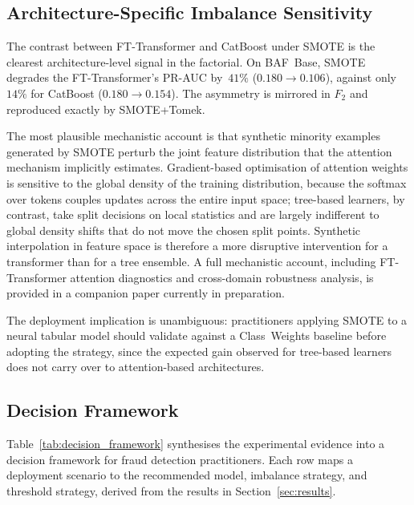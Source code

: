 \documentclass[a4paper,fleqn]{cas-sc}
\begin{document}
\subsection{Architecture-Specific Imbalance Sensitivity}
\label{subsec:disc_architecture}

The contrast between FT-Transformer and CatBoost under SMOTE is the clearest
architecture-level signal in the factorial. On BAF~Base, SMOTE degrades the
FT-Transformer's PR-AUC by~$41\%$ ($0.180\!\to\!0.106$), against only~$14\%$ for
CatBoost ($0.180\!\to\!0.154$). The asymmetry is mirrored in $F_2$ and reproduced
exactly by SMOTE+Tomek.

The most plausible mechanistic account is that synthetic minority examples generated by
SMOTE perturb the joint feature distribution that the attention mechanism implicitly
estimates. Gradient-based optimisation of attention weights is sensitive to the global
density of the training distribution, because the softmax over tokens couples updates
across the entire input space; tree-based learners, by contrast, take split decisions on
local statistics and are largely indifferent to global density shifts that do not move
the chosen split points. Synthetic interpolation in feature space is therefore a more
disruptive intervention for a transformer than for a tree ensemble. A full mechanistic
account, including FT-Transformer attention diagnostics and cross-domain robustness
analysis, is provided in a companion paper currently in preparation.

The deployment implication is unambiguous: practitioners applying SMOTE to a neural
tabular model should validate against a Class~Weights baseline before adopting the
strategy, since the expected gain observed for tree-based learners does not carry over
to attention-based architectures.

\subsection{Decision Framework}
\label{subsec:disc_framework}

Table~\ref{tab:decision_framework} synthesises the experimental evidence into a
decision framework for fraud detection practitioners. Each row maps a deployment
scenario to the recommended model, imbalance strategy, and threshold strategy, derived
from the results in Section~\ref{sec:results}.
\end{document}

